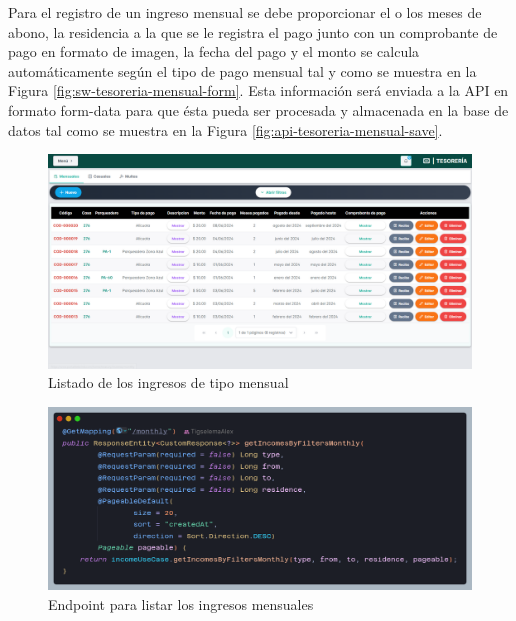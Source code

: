 Para el registro de un ingreso mensual se debe proporcionar el o los meses de abono, la residencia a la que se le registra el pago junto con un comprobante de pago en formato de imagen, la fecha del pago y el monto se calcula automáticamente según el tipo de pago mensual tal y como se muestra en la Figura \ref{fig:sw-tesoreria-mensual-form}.
Esta información será enviada a la API en formato form-data para que ésta pueda ser procesada y almacenada en la base de datos tal como se muestra en la Figura \ref{fig:api-tesoreria-mensual-save}.

\begin{figure}[H]
    \centering
    \includegraphics[width=1\textwidth]{resources/images/sw-tesoreria-mensual-listar}
    \caption{Listado de los ingresos de tipo mensual}
    \label{fig:sw-tesoreria-mensual-listar}
\end{figure}

\begin{figure}[H]
    \centering
    \includegraphics[width=1\textwidth]{resources/images/api-listar-mensuales}
    \caption{Endpoint para listar los ingresos mensuales}
    \label{fig:api-tesoreria-mensual-listar}
\end{figure}

